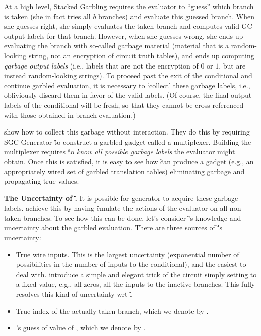 At a high level, Stacked Garbling requires the evaluator to
``guess'' which branch is taken (she in fact tries  all $b$
branches) and evaluate this guessed branch.
When she guesses right, she simply evaluates the taken branch and
computes valid GC output labels for that branch.
However, when she guesses wrong, she ends up evaluating the branch
with so-called garbage material (material that is a random-looking string, not
an encryption of circuit truth tables), and ends up computing
\emph{garbage output labels} (i.e., labels that are not the encryption
of $0$ or $1$, but are instead random-looking strings).
%
To proceed past the exit of the conditional and continue garbled evaluation, it is necessary to
`collect'  these garbage labels, i.e., obliviously  discard them in favor of the valid
labels.  (Of course, the final output labels of the conditional will be fresh,  so that they cannot be cross-referenced with those obtained in branch evaluation.)


\HK show how to collect this garbage without
interaction.  They do this by requiring  SGC Generator \G to construct a
garbled gadget called a multiplexer.
Building the \HK multiplexer requires \G to {\em know all possible
garbage labels} the evaluator might obtain.  Once this is satisfied, it is easy to see how \G can produce a gadget (e.g., an appropriately wired set of garbled translation tables) eliminating garbage and propagating true values.


{\bf The Uncertainty of \G.}
It is possible for generator to acquire these garbage labels.  \HK achieve this by having \G  emulate the actions of the
evaluator \E on all non-taken branches.  To see how this can be done, let's consider \G's knowledge and uncertainty about the garbled evaluation.  There are three sources of \G's uncertainty:
\begin{itemize}
	\item True wire inputs.  This is the largest uncertainty (exponential number of possibilities in the number of inputs to the conditional), and the easiest to deal with.  \HK introduce a simple and elegant trick of the circuit simply setting to a fixed value, e.g., all zeros, all the inputs to the inactive branches.  This fully resolves this kind of uncertainty wrt \G.
	\item True index of the actually taken branch, which we denote by \truth.
	\item \E's guess of value of \truth, which we denote by \guess.
\end{itemize}

